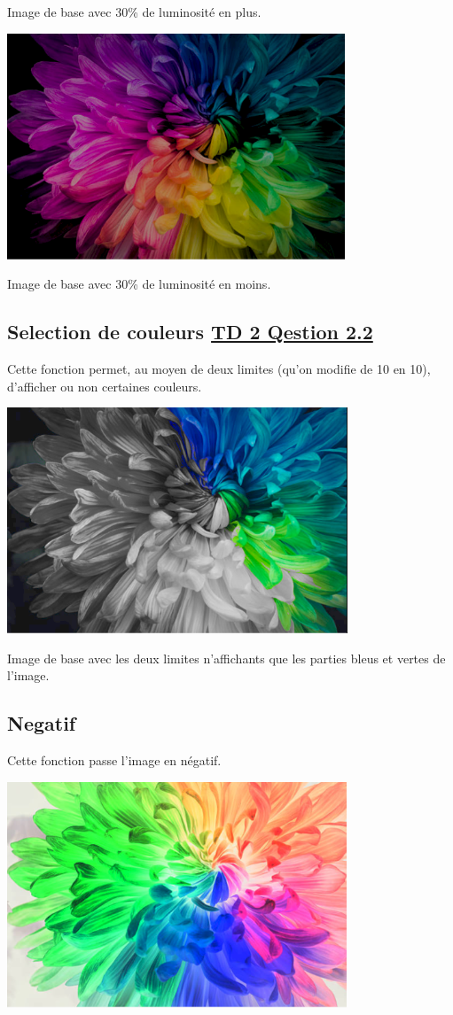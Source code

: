 \documentclass{article}
\begin{document}
Image de base avec 30\% de luminosité en plus.
\bigbreak

\includegraphics{../LuminositeMoins3}

Image de base avec 30\% de luminosité en moins.

\subsection{Selection de couleurs \underline{TD 2 Qestion 2.2}}

Cette fonction permet, au moyen de deux limites (qu'on modifie de 10 en 10), d'afficher ou non certaines couleurs.
\bigbreak

\includegraphics{../SelectedColor}

Image de base avec les deux limites n'affichants que les parties bleus et vertes de l'image.

\subsection{Negatif}
Cette fonction passe l'image en négatif.
\bigbreak

\includegraphics{../Negatif}
\end{document}
